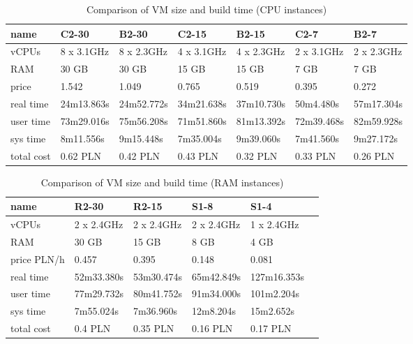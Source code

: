 \documentclass[printmode]{mgr}
\begin{document}
\begin{table}
  \begin{tabular}{| p{2.5cm} | p{2cm} | p{2cm} | p{2cm} | p{2cm} | p{2cm} | p{2cm} |}
    \hline
    name & C2-30 & B2-30 & C2-15 & B2-15 & C2-7 & B2-7 \\
    \hline
    vCPUs & 8 x 3.1GHz & 8 x 2.3GHz & 4 x 3.1GHz & 4 x 2.3GHz & 2 x 3.1GHz & 2 x 2.3GHz \\
    \hline
    RAM & 30 GB & 30 GB & 15 GB & 15 GB & 7 GB & 7 GB \\
    \hline
    price & 1.542 & 1.049 & 0.765 & 0.519 & 0.395 & 0.272 \\
    \hline
    real time & 24m13.863s & 24m52.772s & 34m21.638s & 37m10.730s & 50m4.480s & 57m17.304s \\
    \hline
    user time & 73m29.016s & 75m56.208s & 71m51.860s & 81m13.392s & 72m39.468s & 82m59.928s \\
    \hline
    sys time & 8m11.556s & 9m15.448s & 7m35.004s & 9m39.060s & 7m41.560s & 9m27.172s \\
    \hline
    total cost & 0.62 PLN & 0.42 PLN & 0.43 PLN & 0.32 PLN & 0.33 PLN & 0.26 PLN \\
    \hline
  \end{tabular}
  \caption{Comparison of VM size and build time (CPU instances)}
\end{table}



\begin{table}
  \begin{tabular}{| p{2.5cm} | p{3cm} | p{3cm} | p{3cm} | p{3cm} | p{3cm} |}
    \hline
    name & R2-30 & R2-15 & S1-8 & S1-4 \\
    \hline
    vCPUs & 2 x 2.4GHz & 2 x 2.4GHz & 2 x 2.4GHz & 1 x 2.4GHz \\
    \hline
    RAM & 30 GB & 15 GB & 8 GB & 4 GB \\
    \hline
    price PLN/h& 0.457 & 0.395 & 0.148 & 0.081 \\
    \hline
    real time & 52m33.380s & 53m30.474s & 65m42.849s & 127m16.353s \\
    \hline
    user time & 77m29.732s & 80m41.752s & 91m34.000s & 101m2.204s \\
    \hline
    sys time & 7m55.024s & 7m36.960s & 12m8.204s & 15m2.652s \\
    \hline
    total cost & 0.4 PLN & 0.35 PLN & 0.16 PLN & 0.17 PLN \\
    \hline
  \end{tabular}
  \caption{Comparison of VM size and build time (RAM instances)}
\end{table}
\end{document}
